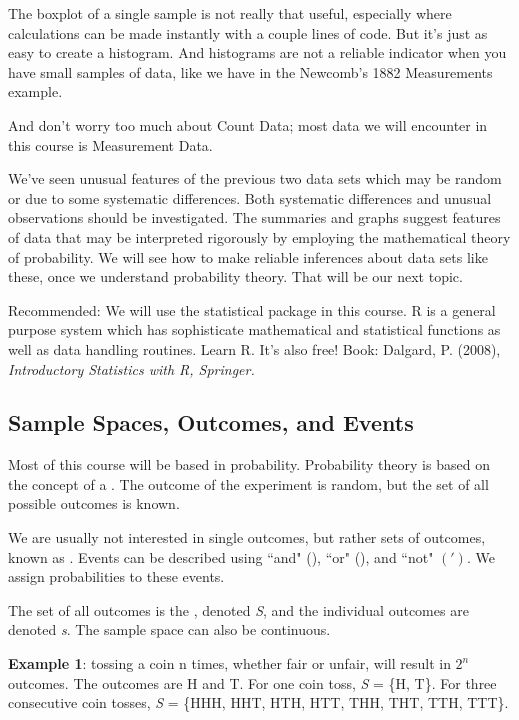 The boxplot of a single sample is not really that useful, especially where calculations can be made instantly with a couple lines of code. But it's just as easy to create a histogram. And histograms are not a reliable indicator when you have small samples of data, like we have in the Newcomb's 1882 Measurements example.

And don't worry too much about Count Data; most data we will encounter in this course is Measurement Data.

We've seen unusual features of the previous two data sets which may be random or due to some systematic differences. Both systematic differences and unusual observations should be investigated. The summaries and graphs suggest features of data that may be interpreted rigorously by employing the mathematical theory of probability. We will see how to make reliable inferences about data sets like these, once we understand probability theory. That will be our next topic.

Recommended: We will use the  statistical package in this course. R is a general purpose system which has sophisticate mathematical and statistical functions as well as data handling routines. Learn R. It's also free! Book: Dalgard, P. (2008), \textit{Introductory Statistics with R, Springer.}

\subsection{Sample Spaces, Outcomes, and Events}
Most of this course will be based in probability. Probability theory is based on the concept of a . The outcome of the experiment is random, but the set of all possible outcomes is known.

We are usually not interested in single outcomes, but rather sets of outcomes, known as . Events can be described using ``and" (\cap), ``or" (\cup), and ``not" $(\mathsf{'})$. We assign probabilities to these events.

The set of all outcomes is the , denoted \textit{S}, and the individual outcomes are denoted \textit{s}. The sample space can also be continuous.

\textbf{Example 1}: tossing a coin n times, whether fair or unfair, will result in $2^n$ outcomes. The outcomes are H and T. For one coin toss, \textit{S} = \{H, T\}. For three consecutive coin tosses, \textit{S} = \{HHH, HHT, HTH, HTT, THH, THT, TTH, TTT\}.

